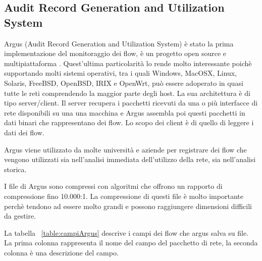 \documentclass[../main.tex]{subfiles}
\begin{document}
\subsection{Audit Record Generation and Utilization System}
Argus (Audit Record Generation and Utilization System) è stato la prima implementazione del monitoraggio dei flow, è un progetto open source e multipiattaforma \cite{Argus}.
Quest'ultima particolarità lo rende molto interessante poichè supportando molti sistemi operativi, tra i quali Windows, MacOSX, Linux, Solaris, FreeBSD, OpenBSD, IRIX e OpenWrt, può essere adoperato in quasi tutte le reti comprendendo la maggior parte degli host. La sua architettura è di tipo server/client. Il server recupera i pacchetti ricevuti da una o più interfacce di rete disponibili su una una macchina e Argus assembla poi questi pacchetti in dati binari che rappresentano dei flow. Lo scopo dei client è di quello di leggere i dati dei flow. 

Argus viene utilizzato da molte università e aziende per registrare dei flow che vengono utilizzati sia nell'analisi immediata dell'utilizzo della rete, sia nell'analisi storica.

I file di Argus sono compressi con algoritmi che offrono un rapporto di compressione fino 10.000:1. La compressione di questi file è molto importante perchè tendono ad essere molto grandi e possono raggiungere dimensioni difficili da gestire.


La tabella ~\ref{table:campiArgus} descrive i campi dei flow che argus salva su file. La prima colonna rappresenta il nome del campo del pacchetto di rete, la seconda colonna è una descrizione del campo.
\end{document}
